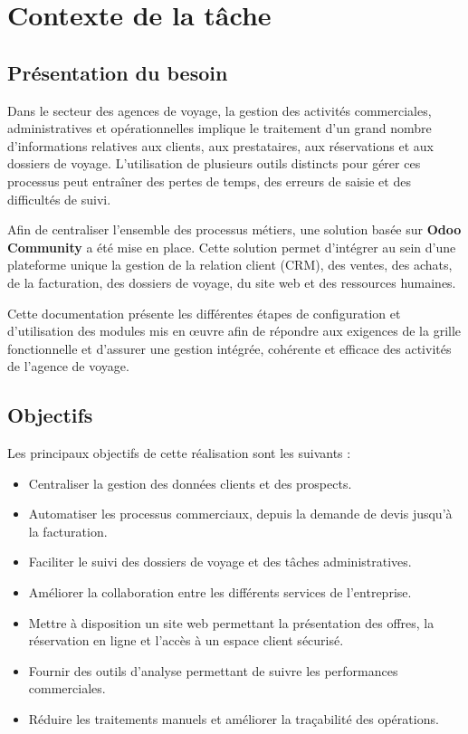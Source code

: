 \documentclass[12pt,a4paper]{report}
\begin{document}
\chapter{Contexte de la tâche}

\section{Présentation du besoin}

Dans le secteur des agences de voyage, la gestion des activités commerciales, administratives et opérationnelles implique le traitement d'un grand nombre d'informations relatives aux clients, aux prestataires, aux réservations et aux dossiers de voyage. L'utilisation de plusieurs outils distincts pour gérer ces processus peut entraîner des pertes de temps, des erreurs de saisie et des difficultés de suivi.

Afin de centraliser l'ensemble des processus métiers, une solution basée sur \textbf{Odoo Community} a été mise en place. Cette solution permet d'intégrer au sein d'une plateforme unique la gestion de la relation client (CRM), des ventes, des achats, de la facturation, des dossiers de voyage, du site web et des ressources humaines.

Cette documentation présente les différentes étapes de configuration et d'utilisation des modules mis en œuvre afin de répondre aux exigences de la grille fonctionnelle et d'assurer une gestion intégrée, cohérente et efficace des activités de l'agence de voyage.

\section{Objectifs}

Les principaux objectifs de cette réalisation sont les suivants :

\begin{itemize}
    \item Centraliser la gestion des données clients et des prospects.
    \item Automatiser les processus commerciaux, depuis la demande de devis jusqu'à la facturation.
    \item Faciliter le suivi des dossiers de voyage et des tâches administratives.
    \item Améliorer la collaboration entre les différents services de l'entreprise.
    \item Mettre à disposition un site web permettant la présentation des offres, la réservation en ligne et l'accès à un espace client sécurisé.
    \item Fournir des outils d'analyse permettant de suivre les performances commerciales.
    \item Réduire les traitements manuels et améliorer la traçabilité des opérations.
\end{itemize}
\end{document}

